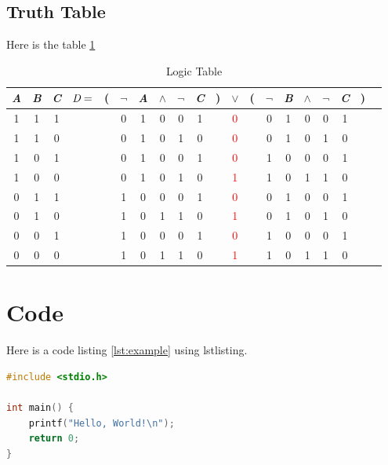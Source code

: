 \documentclass{scrartcl}
\begin{document}
\subsection{Truth Table}
Here is the table \ref{tab:IDK}
\noindent
\FloatBarrier
\begin{table}[ht]
    \centering
    \caption{Logic Table}
    \begin{tabular}{@{ }c@{ }@{ }c@{ }@{ }c | c@{ }@{}c@{}@{ }c@{ }@{ }c@{ }@{ }c@{ }@{ }c@{ }@{ }c@{ }@{}c@{}@{ }c@{ }@{}c@{}@{ }c@{ }@{ }c@{ }@{ }c@{ }@{ }c@{ }@{ }c@{ }@{}c@{}@{ }c}
        \emph{A} & \emph{B} & \emph{C} &  $\emph{D}=$ & ( & $\lnot$ & \emph{A} & $\land$ & $\lnot$ & \emph{C} & ) & $\lor$ & ( & $\lnot$ & \emph{B} & $\land$ & $\lnot$ & \emph{C} & ) & \\
        \hline
        1 & 1 & 1 &  &  & 0 & 1 & 0 & 0 & 1 &  & \textcolor{red}{0} &  & 0 & 1 & 0 & 0 & 1 &  & \\
        1 & 1 & 0 &  &  & 0 & 1 & 0 & 1 & 0 &  & \textcolor{red}{0} &  & 0 & 1 & 0 & 1 & 0 &  & \\
        1 & 0 & 1 &  &  & 0 & 1 & 0 & 0 & 1 &  & \textcolor{red}{0} &  & 1 & 0 & 0 & 0 & 1 &  & \\
        1 & 0 & 0 &  &  & 0 & 1 & 0 & 1 & 0 &  & \textcolor{red}{1} &  & 1 & 0 & 1 & 1 & 0 &  & \\
        0 & 1 & 1 &  &  & 1 & 0 & 0 & 0 & 1 &  & \textcolor{red}{0} &  & 0 & 1 & 0 & 0 & 1 &  & \\
        0 & 1 & 0 &  &  & 1 & 0 & 1 & 1 & 0 &  & \textcolor{red}{1} &  & 0 & 1 & 0 & 1 & 0 &  & \\
        0 & 0 & 1 &  &  & 1 & 0 & 0 & 0 & 1 &  & \textcolor{red}{0} &  & 1 & 0 & 0 & 0 & 1 &  & \\
        0 & 0 & 0 &  &  & 1 & 0 & 1 & 1 & 0 &  & \textcolor{red}{1} &  & 1 & 0 & 1 & 1 & 0 &  & \\
    \end{tabular}
    \label{tab:IDK}
\end{table}
\FloatBarrier
\section{Code}
Here is a code listing \ref{lst:example} using lstlisting.
\begin{lstlisting}[language=C, caption={Example Code}, label=lst:example, breaklines=true, escapeinside='']
#include <stdio.h>

int main() {
    printf("Hello, World!\n");
    return 0;
}
\end{lstlisting}
\end{document}
